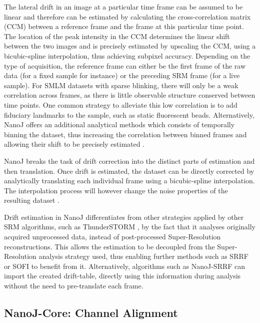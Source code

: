  The lateral drift in an image at a particular time frame can be assumed to be linear and therefore can be estimated by calculating the cross-correlation matrix (CCM) between a reference frame and the frame at this particular time point. The location of the peak intensity in the CCM determines the linear shift between the two images and is precisely estimated by upscaling the CCM, using a bicubic-spline interpolation, thus achieving subpixel accuracy. Depending on the type of acquisition, the reference frame can either be the first frame of the raw data (for a fixed sample for instance) or the preceding SRM frame (for a live sample). For SMLM datasets with sparse blinking, there will only be a weak correlation across frames, as there is little observable structure conserved between time points. One common strategy to alleviate this low correlation is to add fiduciary landmarks to the sample, such as static fluorescent beads. Alternatively, NanoJ offers an additional analytical methods which consists of temporally binning the dataset, thus increasing the correlation between binned frames and allowing their shift to be precisely estimated \cite{mlodzianoski2011sample}. 

 NanoJ breaks the task of drift correction into the distinct parts of estimation and then translation. Once drift is estimated, the dataset can be directly corrected by analytically translating each individual frame using a bicubic-spline interpolation. The interpolation process will however change the noise properties of the resulting dataset \cite{blaysat2016effect}.

 Drift estimation in NanoJ differentiates from other strategies applied by other SRM algorithms, such as ThunderSTORM \cite{ovesny2014thunderstorm}, by the fact that it analyses originally acquired unprocessed data, instead of post-processed Super-Resolution reconstructions. This allows the estimation to be decoupled from the Super-Resolution analysis strategy used, thus enabling further methods such as SRRF or SOFI \cite{dertinger2009fast} to benefit from it. Alternatively, algorithms such as NanoJ-SRRF can import the created drift-table, directly using this information during analysis without the need to pre-translate each frame.   

\subsection*{NanoJ-Core: Channel Alignment}


